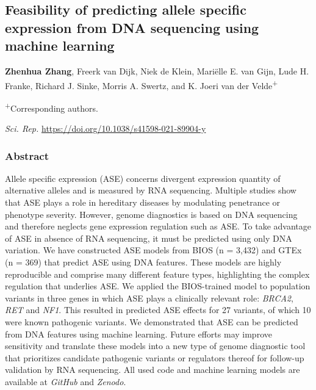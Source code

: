\documentclass{book}
\begin{document}
\renewcommand{\thetable}{\textbf{Table \arabic{chapter}.\arabic{table}}}
\renewcommand{\thefigure}{\textbf{Figure \arabic{chapter}.\arabic{figure}}}

\begin{refsection} %

\chapter{Feasibility of predicting allele specific expression from DNA sequencing using machine learning}
\textbf{Zhenhua Zhang}, Freerk van Dijk, Niek de Klein, Mariëlle E. van Gijn, Lude H. Franke, Richard J. Sinke, Morris A. Swertz, and K. Joeri van der Velde\textsuperscript{+}

\vfill
\begin{flushright}
  \textsuperscript{+}Corresponding authors. \par
  \textit{Sci. Rep.} \url{https://doi.org/10.1038/s41598-021-89904-y}
\end{flushright}

\newpage

\subsection*{Abstract}
Allele specific expression (ASE) concerns divergent expression quantity of alternative alleles and is measured by RNA sequencing.
Multiple studies show that ASE plays a role in hereditary diseases by modulating penetrance or phenotype severity.
However, genome diagnostics is based on DNA sequencing and therefore neglects gene expression regulation such as ASE.
To take advantage of ASE in absence of RNA sequencing, it must be predicted using only DNA variation.
We have constructed ASE models from BIOS (n = 3,432) and GTEx (n = 369) that predict ASE using DNA features.
These models are highly reproducible and comprise many different feature types, highlighting the complex regulation that underlies ASE.
We applied the BIOS-trained model to population variants in three genes in which ASE plays a clinically relevant role: \textit{BRCA2}, \textit{RET} and \textit{NF1}.
This resulted in predicted ASE effects for 27 variants, of which 10 were known pathogenic variants.
We demonstrated that ASE can be predicted from DNA features using machine learning.
Future efforts may improve sensitivity and translate these models into a new type of genome diagnostic tool that prioritizes candidate pathogenic variants or regulators thereof for follow-up validation by RNA sequencing.
All used code and machine learning models are available at \textit{GitHub} and \textit{Zenodo}.


\end{refsection}
\end{document}
